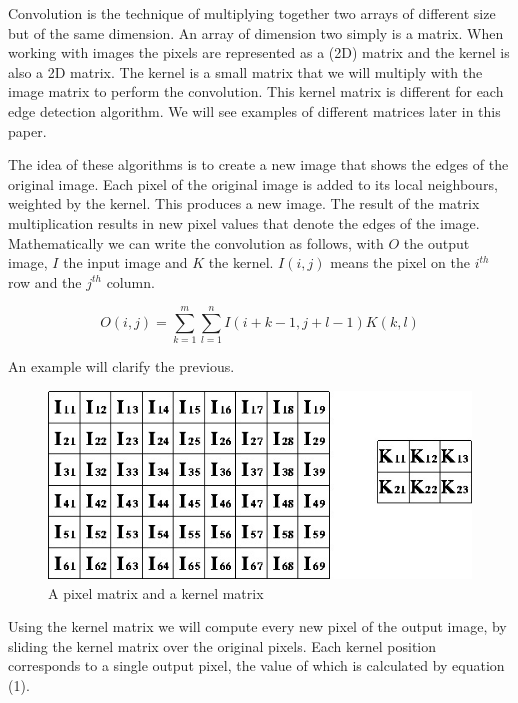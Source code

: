 \documentclass[12pt]{article}
\begin{document}
Convolution is the technique of multiplying together two arrays of different size but of the same dimension. An array of dimension two simply is a matrix. When working with images the pixels are represented as a (2D) matrix and the kernel is also a 2D matrix.
The kernel is a small matrix that we will multiply with the image matrix to perform the convolution. This kernel matrix is different for each edge detection algorithm. We will see examples of different matrices later in this paper. 
\newline

The idea of these algorithms is to create a new image that shows the edges of the original image. Each pixel of the original image is added to its local neighbours, weighted by the kernel. This produces a new image. The result of the matrix multiplication results in new pixel values that denote the edges of the image. 
Mathematically we can write the convolution as follows, with $O$ the output image, $I$ the input image and $K$ the kernel. $I(i,j)$ means the pixel on the $i^{th}$ row and the $j^{th}$ column.

\begin{equation}
O(i, j) =  \sum\limits_{k=1}^m\sum\limits_{l=1}^n I(i + k - 1, j + l - 1)K(k,l)
\end{equation}
\newline

An example will clarify the previous.

\begin{figure}[h]
\centering
\includegraphics[scale = 0.5]{img/convolution}
\caption{A pixel matrix and a kernel matrix}
\label{kernel}
\end{figure}

Using the kernel matrix we will compute every new pixel of the output image, by sliding the kernel matrix over the original pixels. Each kernel position corresponds to a single output pixel, the value of which is calculated by equation (1).
\newline
\end{document}
